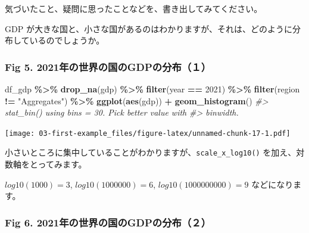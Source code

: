 \documentclass[
  xelatex, ja=standard]{bxjsbook}
\newenvironment{Shaded}{\begin{snugshade}}{\end{snugshade}}
\newcommand{\CommentTok}[1]{\textcolor[rgb]{0.56,0.35,0.01}{\textit{#1}}}
\newcommand{\DecValTok}[1]{\textcolor[rgb]{0.00,0.00,0.81}{#1}}
\newcommand{\FunctionTok}[1]{\textcolor[rgb]{0.13,0.29,0.53}{\textbf{#1}}}
\newcommand{\NormalTok}[1]{#1}
\newcommand{\SpecialCharTok}[1]{\textcolor[rgb]{0.81,0.36,0.00}{\textbf{#1}}}
\newcommand{\StringTok}[1]{\textcolor[rgb]{0.31,0.60,0.02}{#1}}
\theoremstyle{definition}
\theoremstyle{definition}
\theoremstyle{definition}
\theoremstyle{definition}
\theoremstyle{remark}
\begin{document}
気づいたこと、疑問に思ったことなどを、書き出してみてください。

GDP が大きな国と、小さな国があるのはわかりますが、それは、どのように分布しているのでしょうか。

\hypertarget{fig-5.-2021ux5e74ux306eux4e16ux754cux306eux56fdux306egdpux306eux5206ux5e03uxff11}{%
\subsubsection{Fig 5. 2021年の世界の国のGDPの分布（１）}\label{fig-5.-2021ux5e74ux306eux4e16ux754cux306eux56fdux306egdpux306eux5206ux5e03uxff11}}

\begin{Shaded}
\begin{Highlighting}[]
\NormalTok{df\_gdp }\SpecialCharTok{\%\textgreater{}\%} \FunctionTok{drop\_na}\NormalTok{(gdp) }\SpecialCharTok{\%\textgreater{}\%} 
  \FunctionTok{filter}\NormalTok{(year }\SpecialCharTok{==} \DecValTok{2021}\NormalTok{) }\SpecialCharTok{\%\textgreater{}\%} \FunctionTok{filter}\NormalTok{(region }\SpecialCharTok{!=} \StringTok{"Aggregates"}\NormalTok{) }\SpecialCharTok{\%\textgreater{}\%}
  \FunctionTok{ggplot}\NormalTok{(}\FunctionTok{aes}\NormalTok{(gdp)) }\SpecialCharTok{+} \FunctionTok{geom\_histogram}\NormalTok{()}
\CommentTok{\#\textgreater{} \textasciigrave{}stat\_bin()\textasciigrave{} using \textasciigrave{}bins = 30\textasciigrave{}. Pick better value with}
\CommentTok{\#\textgreater{} \textasciigrave{}binwidth\textasciigrave{}.}
\end{Highlighting}
\end{Shaded}

\texttt{[image: 03-first-example\_files/figure-latex/unnamed-chunk-17-1.pdf]}

小さいところに集中していることがわかりますが、\texttt{scale\_x\_log10()} を加え、対数軸をとってみます。

\(log10(1000) = 3\), \(log10(1000000) = 6\), \(log10(1000000000) = 9\) などになります。

\hypertarget{fig-6.-2021ux5e74ux306eux4e16ux754cux306eux56fdux306egdpux306eux5206ux5e03uxff12}{%
\subsubsection{Fig 6. 2021年の世界の国のGDPの分布（２）}\label{fig-6.-2021ux5e74ux306eux4e16ux754cux306eux56fdux306egdpux306eux5206ux5e03uxff12}}
\end{document}

